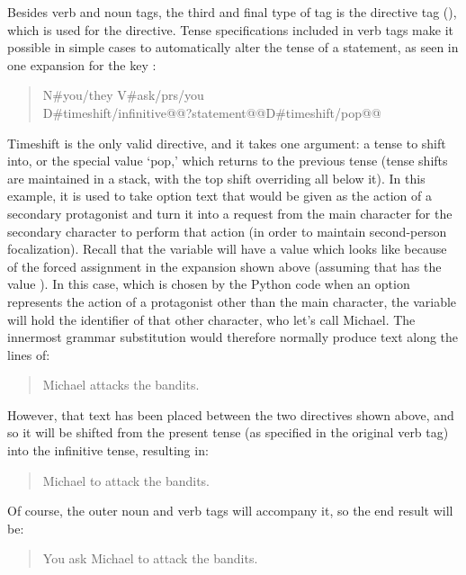 Besides verb and noun tags, the third and final type of tag is the directive tag (), which is used for the  directive.
%
Tense specifications included in verb tags make it possible in simple cases to automatically alter the tense of a statement, as seen in one expansion for the key :

\begin{quote}
\ttfamily
N\#you/they V\#ask/prs/you \\
\ind D\#timeshift/infinitive@@?statement@@D\#timeshift/pop@@
\end{quote}

Timeshift is the only valid directive, and it takes one argument: a tense to shift into, or the special value `pop,' which returns to the previous tense (tense shifts are maintained in a stack, with the top shift overriding all below it).
%
In this example, it is used to take option text that would be given as the action of a secondary protagonist and turn it into a request from the main character for the secondary character to perform that action (in order to maintain second-person focalization).
%
Recall that the  variable will have a value which looks like  because of the forced assignment in the  expansion shown above (assuming that  has the value ).
%
In this case, which is chosen by the Python code when an option represents the action of a protagonist other than the main character, the  variable will hold the identifier of that other character, who let's call Michael.
%
The innermost grammar substitution would therefore normally produce text along the lines of:

\begin{quote}
  Michael attacks the bandits.
\end{quote}

However, that text has been placed between the two  directives shown above, and so it will be shifted from the present tense (as specified in the original verb tag) into the infinitive tense, resulting in:

\begin{quote}
  Michael to attack the bandits.
\end{quote}

Of course, the outer noun and verb tags will accompany it, so the end result will be:

\begin{quote}
  You ask Michael to attack the bandits.
\end{quote}

